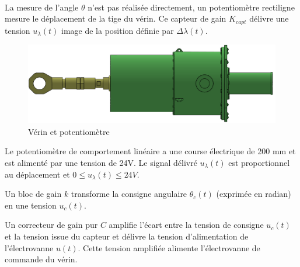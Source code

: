 
~\

La mesure de l'angle $\theta$ n'est pas réalisée directement, un potentiomètre rectiligne mesure le déplacement de la tige du vérin. Ce capteur de gain $K_{capt}$ délivre une tension $u_\lambda(t)$ image de la position définie par $\Delta\lambda(t)$.

\begin{figure}[ht!]
\begin{center}
 \includegraphics[width=0.7\linewidth]{img/fig09}
\end{center}
\caption{Vérin et potentiomètre}
\label{fig09}
\end{figure}

\newpage

Le potentiomètre de comportement linéaire a une course électrique de 200 mm et est alimenté par une tension de 24V. Le signal délivré $u_\lambda(t)$ est proportionnel au déplacement et $0\leq u_\lambda(t)\leq 24V$.


Un bloc de gain $k$ transforme la consigne angulaire $\theta_c(t)$ (exprimée en radian) en une tension $u_c(t)$.

Un correcteur de gain pur $C$ amplifie l'écart entre la tension de consigne $u_c(t)$ et la tension issue du capteur et délivre la tension d'alimentation de l'électrovanne $u(t)$. Cette tension amplifiée alimente l’électrovanne de commande du vérin.



